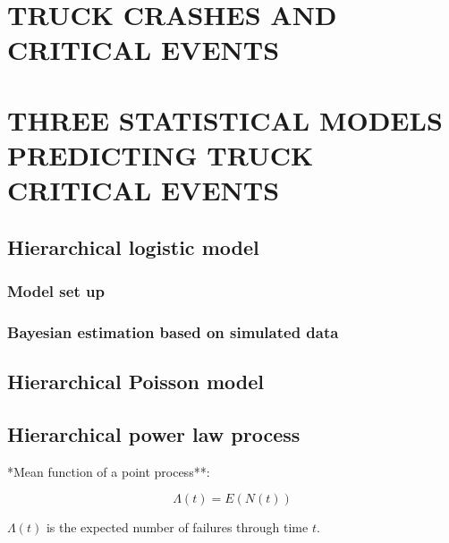 \documentclass[12pt]{book}
\numberwithin{equation}{chapter}
\begin{document}
\hypertarget{truck-crashes-and-critical-events-1}{%
\chapter{TRUCK CRASHES AND CRITICAL EVENTS}\label{truck-crashes-and-critical-events-1}}

\hypertarget{three-statistical-models-predicting-truck-critical-events}{%
\chapter{THREE STATISTICAL MODELS PREDICTING TRUCK CRITICAL EVENTS}\label{three-statistical-models-predicting-truck-critical-events}}

\hypertarget{hierarchical-logistic-model}{%
\section{Hierarchical logistic model}\label{hierarchical-logistic-model}}

\hypertarget{model-set-up}{%
\subsection{Model set up}\label{model-set-up}}

\hypertarget{bayesian-estimation-based-on-simulated-data}{%
\subsection{Bayesian estimation based on simulated data}\label{bayesian-estimation-based-on-simulated-data}}

\hypertarget{hierarchical-poisson-model}{%
\section{Hierarchical Poisson model}\label{hierarchical-poisson-model}}

\hypertarget{hierarchical-power-law-process}{%
\section{Hierarchical power law process}\label{hierarchical-power-law-process}}

*Mean function of a point process**:

\[\Lambda(t) = E(N(t))\]

\(\Lambda(t)\) is the expected number of failures through time \(t\).
\end{document}
